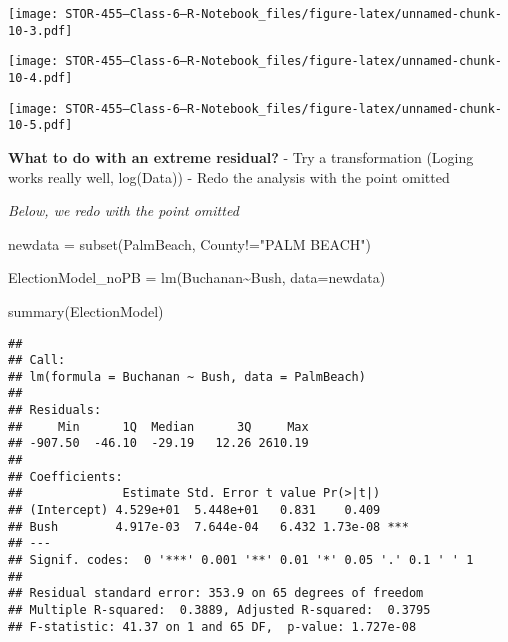 \documentclass[
]{article}
\newenvironment{Shaded}{\begin{snugshade}}{\end{snugshade}}
\newcommand{\AttributeTok}[1]{\textcolor[rgb]{0.77,0.63,0.00}{#1}}
\newcommand{\CommentTok}[1]{\textcolor[rgb]{0.56,0.35,0.01}{\textit{#1}}}
\newcommand{\ConstantTok}[1]{\textcolor[rgb]{0.00,0.00,0.00}{#1}}
\newcommand{\DecValTok}[1]{\textcolor[rgb]{0.00,0.00,0.81}{#1}}
\newcommand{\FunctionTok}[1]{\textcolor[rgb]{0.00,0.00,0.00}{#1}}
\newcommand{\NormalTok}[1]{#1}
\newcommand{\OtherTok}[1]{\textcolor[rgb]{0.56,0.35,0.01}{#1}}
\newcommand{\SpecialCharTok}[1]{\textcolor[rgb]{0.00,0.00,0.00}{#1}}
\newcommand{\StringTok}[1]{\textcolor[rgb]{0.31,0.60,0.02}{#1}}
\begin{document}
\texttt{[image: STOR-455---Class-6---R-Notebook\_files/figure-latex/unnamed-chunk-10-3.pdf]}

\begin{Shaded}
\end{Shaded}

\texttt{[image: STOR-455---Class-6---R-Notebook\_files/figure-latex/unnamed-chunk-10-4.pdf]}

\begin{Shaded}
\end{Shaded}

\texttt{[image: STOR-455---Class-6---R-Notebook\_files/figure-latex/unnamed-chunk-10-5.pdf]}

\textbf{What to do with an extreme residual?} - Try a transformation
(Loging works really well, log(Data)) - Redo the analysis with the point
omitted

\emph{Below, we redo with the point omitted}

\begin{Shaded}
\begin{Highlighting}[]
\NormalTok{newdata }\OtherTok{=} \FunctionTok{subset}\NormalTok{(PalmBeach, County}\SpecialCharTok{!=}\StringTok{"PALM BEACH"}\NormalTok{)}

\NormalTok{ElectionModel\_noPB }\OtherTok{=} \FunctionTok{lm}\NormalTok{(Buchanan}\SpecialCharTok{\textasciitilde{}}\NormalTok{Bush, }\AttributeTok{data=}\NormalTok{newdata)}

\FunctionTok{summary}\NormalTok{(ElectionModel)}
\end{Highlighting}
\end{Shaded}

\begin{verbatim}
## 
## Call:
## lm(formula = Buchanan ~ Bush, data = PalmBeach)
## 
## Residuals:
##     Min      1Q  Median      3Q     Max 
## -907.50  -46.10  -29.19   12.26 2610.19 
## 
## Coefficients:
##              Estimate Std. Error t value Pr(>|t|)    
## (Intercept) 4.529e+01  5.448e+01   0.831    0.409    
## Bush        4.917e-03  7.644e-04   6.432 1.73e-08 ***
## ---
## Signif. codes:  0 '***' 0.001 '**' 0.01 '*' 0.05 '.' 0.1 ' ' 1
## 
## Residual standard error: 353.9 on 65 degrees of freedom
## Multiple R-squared:  0.3889, Adjusted R-squared:  0.3795 
## F-statistic: 41.37 on 1 and 65 DF,  p-value: 1.727e-08
\end{verbatim}
\end{document}
